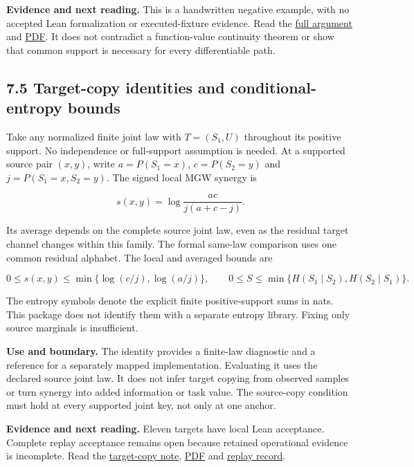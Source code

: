 \documentclass[
  11pt,
  a4paper,
]{article}
\begin{document}
\textbf{Evidence and next reading.} This is a handwritten negative
example, with no accepted Lean formalization or executed-fixture
evidence. Read the
\href{https://github.com/sepahead/pid-rs/blob/main/audit/research/support-change-mi-cusp/EXPOSITION.md}{full
argument} and
\href{https://github.com/sepahead/pid-rs/blob/main/output/pdf/support-change-mi-cusp.pdf}{PDF}.
It does not contradict a function-value continuity theorem or show that
common support is necessary for every differentiable path.


\subsection{7.5 Target-copy identities and conditional-entropy
bounds}\label{75-target-copy-identities-and-conditional-entropy-bounds}

Take any normalized finite joint law with \(T=(S_1,U)\) throughout its
positive support. No independence or full-support assumption is needed.
At a supported source pair \((x,y)\), write \(a=P(S_1=x)\),
\(c=P(S_2=y)\) and \(j=P(S_1=x,S_2=y)\). The signed local MGW synergy is

\[
s(x,y)=\log\frac{ac}{j(a+c-j)}.
\]

Its average depends on the complete source joint law, even as the
residual target channel changes within this family. The formal same-law
comparison uses one common residual alphabet. The local and averaged
bounds are

\[
0\le s(x,y)\le\min\{\log(c/j),\log(a/j)\},\qquad
0\le S\le\min\{H(S_1\mid S_2),H(S_2\mid S_1)\}.
\]

The entropy symbols denote the explicit finite positive-support sums in
nats. This package does not identify them with a separate entropy
library. Fixing only source marginals is insufficient.

\textbf{Use and boundary.} The identity provides a finite-law diagnostic
and a reference for a separately mapped implementation. Evaluating it
uses the declared source joint law. It does not infer target copying
from observed samples or turn synergy into added information or task
value. The source-copy condition must hold at every supported joint key,
not only at one anchor.

\textbf{Evidence and next reading.} Eleven targets have local Lean
acceptance. Complete replay acceptance remains open because retained
operational evidence is incomplete. Read the
\href{https://github.com/sepahead/pid-rs/blob/main/audit/evidence/finite-target-copy-mgw-synergy.md}{target-copy
note},
\href{https://github.com/sepahead/pid-rs/blob/main/output/pdf/finite-target-copy-mgw-synergy.pdf}{PDF}
and
\href{https://github.com/sepahead/pid-rs/blob/main/audit/formal/lean-mgw-target-copy/REPLAY_ACCEPTANCE.json}{replay
record}.
\end{document}
